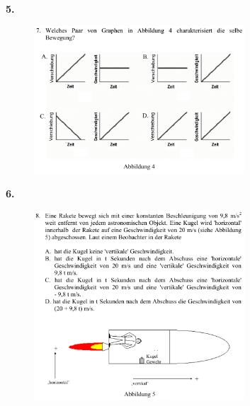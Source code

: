 \documentclass[11pt]{article}
\begin{document}
\noindent\textbf{5.} 
\begin{figure}[H]
    \centering
        \includegraphics[width=0.7\textwidth]{aufgabe-5.png}
\end{figure} 
\noindent\textbf{6.} 
\begin{figure}[H]
    \centering
        \includegraphics[width=0.7\textwidth]{aufgabe-6.png}
\end{figure} 


\pagebreak
\end{document}
